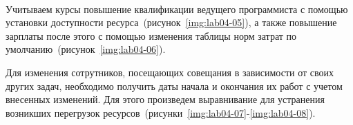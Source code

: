 
~\\

Учитываем курсы повышение квалификации ведущего программиста с помощью
установки доступности ресурса~(рисунок~\ref{img:lab04-05}), а также повышение
зарплаты после этого с помощью изменения таблицы норм затрат по
умолчанию~(рисунок~\ref{img:lab04-06}).



Для изменения сотрутников, посещающих совещания в зависимости от своих других
задач, необходимо получить даты начала и окончания их работ с учетом внесенных
изменений. Для этого произведем выравнивание для устранения возникших
перегрузок ресурсов~(рисунки~\ref{img:lab04-07}-\ref{img:lab04-08}).


